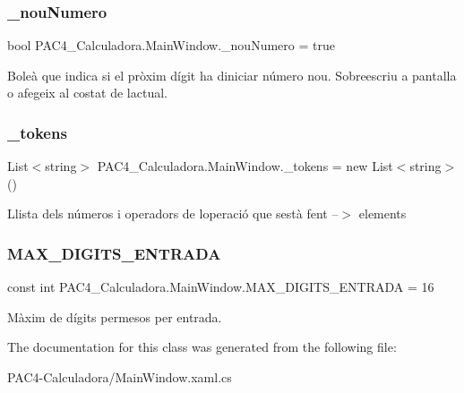 \subsubsection{\texorpdfstring{\+\_\+nou\+Numero}{\_nouNumero}}
{\footnotesize\ttfamily bool P\+A\+C4\+\_\+\+Calculadora.\+Main\+Window.\+\_\+nou\+Numero = true\hspace{0.3cm}{\ttfamily [private]}}



Boleà que indica si el pròxim dígit ha d\textquotesingle{}iniciar número nou. Sobreescriu a pantalla o afegeix al costat de l\textquotesingle{}actual. 

\mbox{\label{class_p_a_c4___calculadora_1_1_main_window_a5d6e70e81a8225be10dd77d9dd7ee9b4}} 
\subsubsection{\texorpdfstring{\+\_\+tokens}{\_tokens}}
{\footnotesize\ttfamily List$<$string$>$ P\+A\+C4\+\_\+\+Calculadora.\+Main\+Window.\+\_\+tokens = new List$<$string$>$()\hspace{0.3cm}{\ttfamily [private]}}



Llista dels números i operadors de l\textquotesingle{}operació que s\textquotesingle{}està fent --$>$ elements 

\mbox{\label{class_p_a_c4___calculadora_1_1_main_window_a076e89ab8f4a2dc5e7653933ce7ebe22}} 
\subsubsection{\texorpdfstring{M\+A\+X\+\_\+\+D\+I\+G\+I\+T\+S\+\_\+\+E\+N\+T\+R\+A\+DA}{MAX\_DIGITS\_ENTRADA}}
{\footnotesize\ttfamily const int P\+A\+C4\+\_\+\+Calculadora.\+Main\+Window.\+M\+A\+X\+\_\+\+D\+I\+G\+I\+T\+S\+\_\+\+E\+N\+T\+R\+A\+DA = 16\hspace{0.3cm}{\ttfamily [private]}}



Màxim de dígits permesos per entrada. 



The documentation for this class was generated from the following file\+:\begin{DoxyCompactItemize}
\item 
P\+A\+C4-\/\+Calculadora/Main\+Window.\+xaml.\+cs\end{DoxyCompactItemize}
